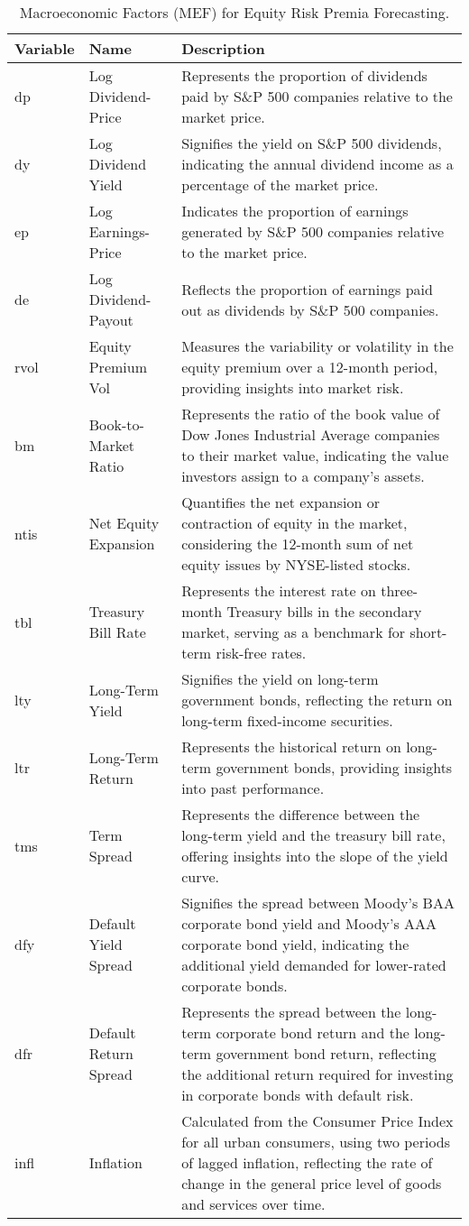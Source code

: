 \documentclass{article}
\begin{document}
\begin{table}[H]
\centering
\begin{tabular}{|l|l|p{7.5cm}|}
\hline
\textbf{Variable} & \textbf{Name} & \textbf{Description} \\
\hline
dp & Log Dividend-Price & Represents the proportion of dividends paid by S\&P 500 companies relative to the market price. \\
dy & Log Dividend Yield & Signifies the yield on S\&P 500 dividends, indicating the annual dividend income as a percentage of the market price. \\
ep & Log Earnings-Price & Indicates the proportion of earnings generated by S\&P 500 companies relative to the market price. \\
de & Log Dividend-Payout & Reflects the proportion of earnings paid out as dividends by S\&P 500 companies. \\
rvol & Equity Premium Vol & Measures the variability or volatility in the equity premium over a 12-month period, providing insights into market risk. \\
bm & Book-to-Market Ratio & Represents the ratio of the book value of Dow Jones Industrial Average companies to their market value, indicating the value investors assign to a company's assets. \\
ntis & Net Equity Expansion & Quantifies the net expansion or contraction of equity in the market, considering the 12-month sum of net equity issues by NYSE-listed stocks. \\
tbl & Treasury Bill Rate & Represents the interest rate on three-month Treasury bills in the secondary market, serving as a benchmark for short-term risk-free rates. \\
lty & Long-Term Yield & Signifies the yield on long-term government bonds, reflecting the return on long-term fixed-income securities. \\
ltr & Long-Term Return & Represents the historical return on long-term government bonds, providing insights into past performance. \\
tms & Term Spread & Represents the difference between the long-term yield and the treasury bill rate, offering insights into the slope of the yield curve. \\
dfy & Default Yield Spread & Signifies the spread between Moody's BAA corporate bond yield and Moody's AAA corporate bond yield, indicating the additional yield demanded for lower-rated corporate bonds. \\
dfr & Default Return Spread & Represents the spread between the long-term corporate bond return and the long-term government bond return, reflecting the additional return required for investing in corporate bonds with default risk. \\
infl & Inflation & Calculated from the Consumer Price Index for all urban consumers, using two periods of lagged inflation, reflecting the rate of change in the general price level of goods and services over time. \\
\hline
\end{tabular}
\caption{Macroeconomic Factors (MEF) for Equity Risk Premia Forecasting.}
\label{tab:MEF}
\end{table}
\end{document}
